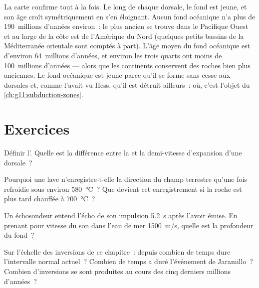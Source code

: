 La carte confirme tout à la fois. Le long de chaque dorsale, le fond est
jeune, et son âge croît symétriquement en s'en éloignant. Aucun fond
océanique n'a plus de \num{190}~millions d'années environ~: le plus ancien
se trouve dans le Pacifique Ouest et au large de la côte est de l'Amérique
du Nord (quelques petits bassins de la Méditerranée orientale sont comptés
à part). L'âge moyen du fond océanique est d'environ \num{64}~millions
d'années, et environ les trois quarts ont moins de 100~millions
d'années --- alors que les continents conservent des roches bien plus
anciennes. Le fond océanique est jeune parce qu'il se forme sans cesse aux
dorsales et, comme l'avait vu Hess, qu'il est détruit ailleurs~: où, c'est
l'objet du \cref{ch:g11:subduction-zones}.

\section{Exercices}

\begin{exercise}[$\star$]\label{exo:g11:drift-to-spreading:1}
Définir l'. Quelle est la différence entre la
 et la demi-vitesse d'expansion d'une dorsale~?
\end{exercise}

\begin{exercise}[$\star$]\label{exo:g11:drift-to-spreading:2}
Pourquoi une lave n'enregistre-t-elle la direction du champ terrestre
qu'une fois refroidie sous environ \qty{580}{\celsius}~? Que devient cet
enregistrement si la roche est plus tard chauffée à \qty{700}{\celsius}~?
\end{exercise}

\begin{exercise}[$\star$]\label{exo:g11:drift-to-spreading:3}
Un échosondeur entend l'écho de son impulsion \qty{5.2}{s} après l'avoir
émise. En prenant pour vitesse du son dans l'eau de mer \qty{1500}{m/s},
quelle est la profondeur du fond~?
\end{exercise}

\begin{exercise}[$\star$]\label{exo:g11:drift-to-spreading:4}
Sur l'échelle des inversions de ce chapitre~: depuis combien de temps dure
l'intervalle normal actuel~? Combien de temps a duré l'événement de
Jaramillo~? Combien d'inversions se sont produites au cours des cinq
derniers millions d'années~?
\end{exercise}

